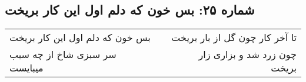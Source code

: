 \begin{center}
\section*{شماره ۲۵: بس خون که دلم اول این کار بریخت}
\label{sec:025}
\begin{longtable}{l p{0.5cm} r}
بس خون که دلم اول این کار بریخت
&&
تا آخر کار چون گل از بار بریخت
\\
سر سبزی شاخ از چه سبب میبایست
&&
چون زرد شد و بزاری زار بریخت
\\
\end{longtable}
\end{center}
